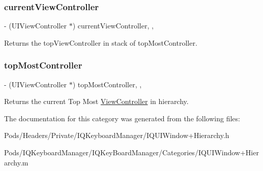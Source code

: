 \subsubsection{\texorpdfstring{current\+View\+Controller}{currentViewController}}
{\footnotesize\ttfamily -\/ (U\+I\+View\+Controller $\ast$) current\+View\+Controller\hspace{0.3cm}{\ttfamily [read]}, {\ttfamily [nonatomic]}, {\ttfamily [strong]}}

Returns the top\+View\+Controller in stack of top\+Most\+Controller. \mbox{\label{category_u_i_window_07_i_q___u_i_window___hierarchy_08_ac917e7ab478546f2cc7be2bfae4afde5}} 
\subsubsection{\texorpdfstring{top\+Most\+Controller}{topMostController}}
{\footnotesize\ttfamily -\/ (U\+I\+View\+Controller $\ast$) top\+Most\+Controller\hspace{0.3cm}{\ttfamily [read]}, {\ttfamily [nonatomic]}, {\ttfamily [strong]}}

Returns the current Top Most \mbox{\hyperlink{interface_view_controller}{View\+Controller}} in hierarchy. 

The documentation for this category was generated from the following files\+:\begin{DoxyCompactItemize}
\item 
Pods/\+Headers/\+Private/\+I\+Q\+Keyboard\+Manager/I\+Q\+U\+I\+Window+\+Hierarchy.\+h\item 
Pods/\+I\+Q\+Keyboard\+Manager/\+I\+Q\+Key\+Board\+Manager/\+Categories/I\+Q\+U\+I\+Window+\+Hierarchy.\+m\end{DoxyCompactItemize}
